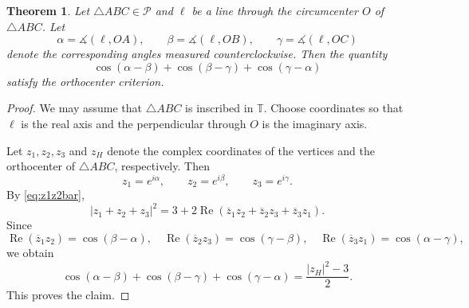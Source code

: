 \documentclass[11pt,reqno]{amsart}
\newtheorem{theorem}{Theorem}[section]
\theoremstyle{definition}
\numberwithin{equation}{section}
\begin{document}
\begin{theorem}\label{thm:focanginv}
Let $\triangle ABC \in \mathcal P$ and $\ell$ be a line through the circumcenter $O$ of $\triangle ABC$. Let
\[
\alpha=\measuredangle(\ell,OA),\qquad
\beta=\measuredangle(\ell,OB),\qquad
\gamma=\measuredangle(\ell,OC)
\]
denote the corresponding angles measured counterclockwise. Then the quantity
\[
\cos(\alpha-\beta)+\cos(\beta-\gamma)+\cos(\gamma-\alpha)
\]
satisfy the orthocenter criterion.
\end{theorem}

\begin{proof}
We may assume that $\triangle ABC$ is inscribed in $\mathbb T$. Choose coordinates so that $\ell$ is the real axis and the perpendicular through $O$ is the imaginary axis. 

Let $z_1,z_2,z_3$ and $z_H$ denote the complex coordinates of the vertices and the orthocenter of $\triangle ABC$, respectively. Then
\[
z_1=e^{i\alpha},\qquad
z_2=e^{i\beta},\qquad
z_3=e^{i\gamma}.
\]
By \eqref{eq:z1z2bar},
\[
|z_1+z_2+z_3|^2
=
3+
2\operatorname{Re}\left(
\overline z_1z_2+
\overline z_2z_3+
\overline z_3z_1
\right).
\]
Since
\[
\operatorname{Re}(\overline z_1z_2)=\cos(\beta-\alpha),\quad
\operatorname{Re}(\overline z_2z_3)=\cos(\gamma-\beta),\quad
\operatorname{Re}(\overline z_3z_1)=\cos(\alpha-\gamma),
\]
we obtain
\[
\cos(\alpha-\beta)+
\cos(\beta-\gamma)+
\cos(\gamma-\alpha)
=
\frac{|z_H|^2-3}{2}.
\]
This proves the claim. 
\end{proof}
\end{document}
